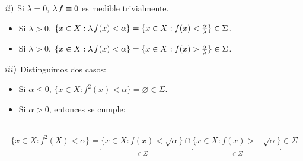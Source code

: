 \documentclass[12pt,a4paper]{article}
\begin{document}
\vspace{2mm}
$\romannumeral 2)$ Si $\lambda = 0$, $\lambda \hspace{0.5mm} f \equiv 0$ es medible trivialmente.
\begin{itemize}
    \item Si $\lambda > 0$, $\{x \in X : \lambda \hspace{0.5mm} f(x) < \alpha\} = \{x \in X : f(x) < \frac{\alpha}{\lambda}\} \in \Sigma$.
    \item Si $\lambda > 0$, $\{x \in X : \lambda \hspace{0.5mm} f(x) < \alpha\} = \{x \in X : f(x) > \frac{\alpha}{\lambda}\} \in \Sigma$.
\end{itemize}

$\romannumeral 3)$ Distinguimos dos casos:
\begin{itemize}
    \item \hspace{-3mm}  Si $\alpha \leq 0$, $\{x \in X : f^2(x) < \alpha\} = \varnothing \in \Sigma$.
    \item Si $\alpha > 0$, entonces se cumple:
\end{itemize}
\\[-4ex]$$\{x \in X : f^2(X) < \alpha\} = \underbracket{\{x \in X : f(x) < \sqrt{\alpha}\}}_{\in \Sigma} \cap \underbracket{\{x \in X : f(x) > - \sqrt{\alpha}\}}_{\in \Sigma} \in \Sigma$$
\end{document}
